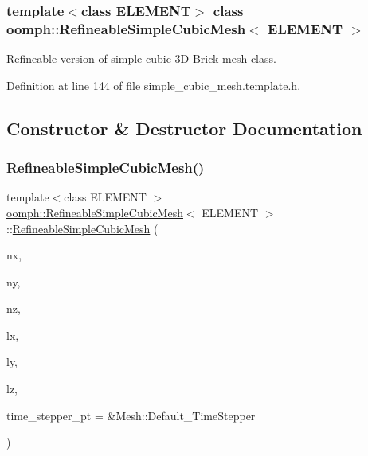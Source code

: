 \subsubsection*{template$<$class E\+L\+E\+M\+E\+NT$>$\newline
class oomph\+::\+Refineable\+Simple\+Cubic\+Mesh$<$ E\+L\+E\+M\+E\+N\+T $>$}

Refineable version of simple cubic 3D Brick mesh class. 

Definition at line 144 of file simple\+\_\+cubic\+\_\+mesh.\+template.\+h.



\subsection{Constructor \& Destructor Documentation}
\mbox{\label{classoomph_1_1RefineableSimpleCubicMesh_a71fab83f3bdc3f0cf7676afb5e313d10}} 
\subsubsection{\texorpdfstring{Refineable\+Simple\+Cubic\+Mesh()}{RefineableSimpleCubicMesh()}\hspace{0.1cm}{\footnotesize\ttfamily [1/2]}}
{\footnotesize\ttfamily template$<$class E\+L\+E\+M\+E\+NT $>$ \\
\hyperlink{classoomph_1_1RefineableSimpleCubicMesh}{oomph\+::\+Refineable\+Simple\+Cubic\+Mesh}$<$ E\+L\+E\+M\+E\+NT $>$\+::\hyperlink{classoomph_1_1RefineableSimpleCubicMesh}{Refineable\+Simple\+Cubic\+Mesh} (\begin{DoxyParamCaption}\item[{const unsigned \&}]{nx,  }\item[{const unsigned \&}]{ny,  }\item[{const unsigned \&}]{nz,  }\item[{const double \&}]{lx,  }\item[{const double \&}]{ly,  }\item[{const double \&}]{lz,  }\item[{Time\+Stepper $\ast$}]{time\+\_\+stepper\+\_\+pt = {\ttfamily \&Mesh\+:\+:Default\+\_\+TimeStepper} }\end{DoxyParamCaption})\hspace{0.3cm}{\ttfamily [inline]}}



